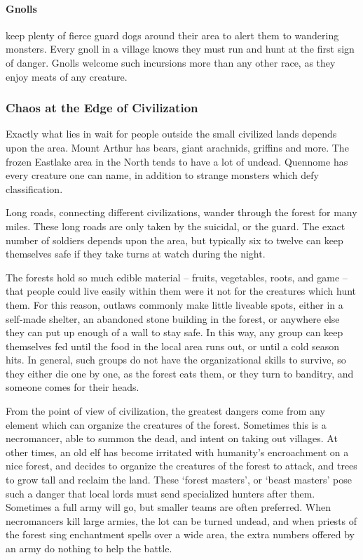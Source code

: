 \begin{multicols}{2}
\paragraph{Gnolls} keep plenty of fierce guard dogs around their area to alert them to wandering monsters.
Every gnoll in a village knows they must run and hunt at the first sign of danger.
Gnolls welcome such incursions more than any other race, as they enjoy meats of any creature.

\subsubsection{Chaos at the Edge of Civilization}

Exactly what lies in wait for people outside the small civilized lands depends upon the area.
Mount Arthur has bears, giant arachnids, griffins and more.
The frozen Eastlake area in the North tends to have a lot of undead.
Quennome has every creature one can name, in addition to strange monsters which defy classification.

Long roads, connecting different civilizations, wander through the forest for many miles.
These long roads are only taken by the suicidal, or the \gls{guard}.
The exact number of soldiers depends upon the area, but typically six to twelve can keep themselves safe if they take turns at watch during the night.

The forests hold so much edible material -- fruits, vegetables, roots, and game -- that people could live easily within them were it not for the creatures which hunt them.
For this reason, outlaws commonly make little liveable spots, either in a self-made shelter, an abandoned stone building in the forest, or anywhere else they can put up enough of a wall to stay safe.
In this way, any group can keep themselves fed until the food in the local area runs out, or until a cold season hits.
In general, such groups do not have the organizational skills to survive, so they either die one by one, as the forest eats them, or they turn to banditry, and someone comes for their heads.

From the point of view of civilization, the greatest dangers come from any element which can organize the creatures of the forest.
Sometimes this is a necromancer, able to summon the dead, and intent on taking out villages.
At other times, an old elf has become irritated with humanity's encroachment on a nice forest, and decides to organize the creatures of the forest to attack, and trees to grow tall and reclaim the land.
These `forest masters', or `beast masters' pose such a danger that local lords must send specialized hunters after them.
Sometimes a full army will go, but smaller teams are often preferred.
When necromancers kill large armies, the lot can be turned undead, and when priests of the forest sing enchantment spells over a wide area, the extra numbers offered by an army do nothing to help the battle.


\end{multicols}
